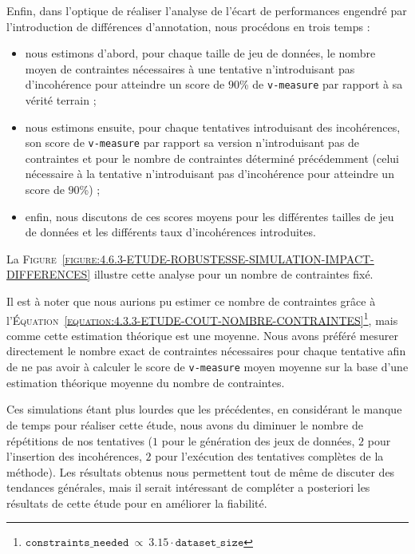 			Enfin, dans l'optique de réaliser l'analyse de l'écart de performances engendré par l'introduction de différences d'annotation, nous procédons en trois temps :
			\begin{itemize}
				\item nous estimons d'abord, pour chaque taille de jeu de données, le nombre moyen de contraintes nécessaires à une tentative n'introduisant pas d'incohérence pour atteindre un score de $90$\% de \texttt{v-measure} par rapport à sa vérité terrain ;
				\item nous estimons ensuite, pour chaque tentatives introduisant des incohérences, son score de \texttt{v-measure} par rapport sa version n'introduisant pas de contraintes et pour le nombre de contraintes déterminé précédemment (celui nécessaire à la tentative n'introduisant pas d'incohérence pour atteindre un score de $90$\%) ;
				\item enfin, nous discutons de ces scores moyens pour les différentes tailles de jeu de données et les différents taux d'incohérences introduites.
			\end{itemize}
			La \textsc{Figure~\ref{figure:4.6.3-ETUDE-ROBUSTESSE-SIMULATION-IMPACT-DIFFERENCES}} illustre cette analyse pour un nombre de contraintes fixé.
			
			\begin{leftBarAuthorOpinion}
				Il est à noter que nous aurions pu estimer ce nombre de contraintes grâce à l'\textsc{Équation~\ref{equation:4.3.3-ETUDE-COUT-NOMBRE-CONTRAINTES}}\footnote{
					$\texttt{constraints\_needed}~\propto~3.15 \cdot \texttt{dataset\_size}$
				}, mais comme cette estimation théorique est une moyenne.
				Nous avons préféré mesurer directement le nombre exact de contraintes nécessaires pour chaque tentative afin de ne pas avoir à calculer le score de \texttt{v-measure} moyen moyenne sur la base d'une estimation théorique moyenne du nombre de contraintes.
			\end{leftBarAuthorOpinion}
			
			\begin{leftBarWarning}
				Ces simulations étant plus lourdes que les précédentes, en considérant le manque de temps pour réaliser cette étude, nous avons du diminuer le nombre de répétitions de nos tentatives ($1$ pour le génération des jeux de données, $2$ pour l'insertion des incohérences, $2$ pour l’exécution des tentatives complètes de la méthode).
				Les résultats obtenus nous permettent tout de même de discuter des tendances générales, mais il serait intéressant de compléter a posteriori les résultats de cette étude pour en améliorer la fiabilité.
			\end{leftBarWarning}
			
